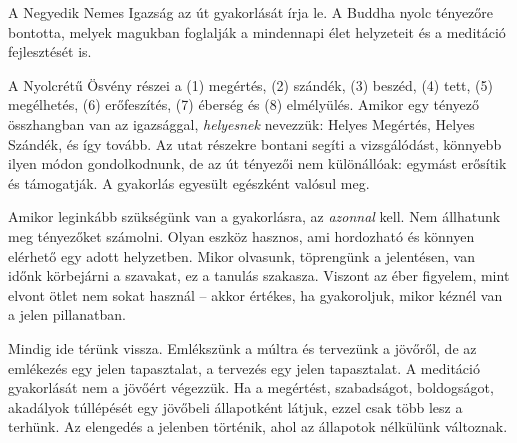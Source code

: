 
A Negyedik Nemes Igazság az út gyakorlását írja le. A Buddha nyolc
tényezőre bontotta, melyek magukban foglalják a mindennapi élet
helyzeteit és a meditáció fejlesztését is.

A Nyolcrétű Ösvény részei a (1) megértés, (2) szándék, (3) beszéd, (4)
tett, (5) megélhetés, (6) erőfeszítés, (7) éberség és (8) elmélyülés.
Amikor egy tényező összhangban van az igazsággal, \emph{helyesnek}
nevezzük: Helyes Megértés, Helyes Szándék, és így tovább. Az utat
részekre bontani segíti a vizsgálódást, könnyebb ilyen módon
gondolkodnunk, de az út tényezői nem különállóak: egymást erősítik és
támogatják. A gyakorlás egyesült egészként valósul meg.

Amikor leginkább szükségünk van a gyakorlásra, az \emph{azonnal} kell.
Nem állhatunk meg tényezőket számolni. Olyan eszköz hasznos, ami
hordozható és könnyen elérhető egy adott helyzetben. Mikor olvasunk,
töprengünk a jelentésen, van időnk körbejárni a szavakat, ez a tanulás
szakasza. Viszont az éber figyelem, mint elvont ötlet nem sokat használ
-- akkor értékes, ha gyakoroljuk, mikor kéznél van a jelen pillanatban.

Mindig ide térünk vissza. Emlékszünk a múltra és tervezünk a jövőről, de
az emlékezés egy jelen tapasztalat, a tervezés egy jelen tapasztalat. A
meditáció gyakorlását nem a jövőért végezzük. Ha a megértést,
szabadságot, boldogságot, akadályok túllépését egy jövőbeli állapotként
látjuk, ezzel csak több lesz a terhünk. Az elengedés a jelenben
történik, ahol az állapotok nélkülünk változnak.
